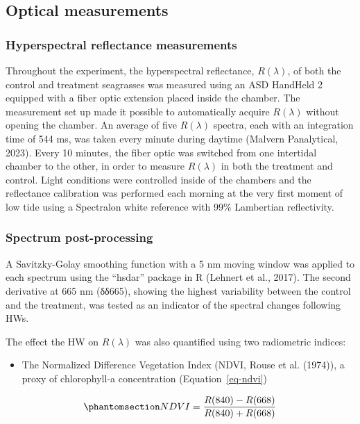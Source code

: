 \documentclass[
  letterpaper,
  DIV=11,
  numbers=noendperiod]{scrartcl}
\providecommand{\tightlist}{%
  \setlength{\itemsep}{0pt}\setlength{\parskip}{0pt}}
\begin{document}
\subsection{Optical measurements}\label{optical-measurements}

\subsubsection{Hyperspectral reflectance
measurements}\label{hyperspectral-reflectance-measurements}

Throughout the experiment, the hyperspectral reflectance,
\(R(\lambda)\), of both the control and treatment seagrasses was
measured using an ASD HandHeld 2 equipped with a fiber optic extension
placed inside the chamber. The measurement set up made it possible to
automatically acquire \(R(\lambda)\) without opening the chamber. An
average of five \(R(\lambda)\) spectra, each with an integration time of
544 ms, was taken every minute during daytime (Malvern Panalytical,
2023). Every 10 minutes, the fiber optic was switched from one
intertidal chamber to the other, in order to measure \(R(\lambda)\) in
both the treatment and control. Light conditions were controlled inside
of the chambers and the reflectance calibration was performed each
morning at the very first moment of low tide using a Spectralon white
reference with 99\% Lambertian reflectivity.

\subsubsection{Spectrum post-processing}\label{spectrum-post-processing}

A Savitzky-Golay smoothing function with a 5 nm moving window was
applied to each spectrum using the ``hsdar'' package in R (Lehnert et
al., 2017). The second derivative at 665 nm (δδ665), showing the highest
variability between the control and the treatment, was tested as an
indicator of the spectral changes following HWs.

The effect the HW on \(R(\lambda)\) was also quantified using two
radiometric indices:

\begin{itemize}
\tightlist
\item
  The Normalized Difference Vegetation Index (NDVI, Rouse et al.
  (1974)), a proxy of chlorophyll-a concentration
  (Equation~\ref{eq-ndvi})
\end{itemize}

\begin{equation}\phantomsection\label{eq-ndvi}{
NDVI = \frac{R(840)-R(668)}{R(840)+R(668)}
}\end{equation}
\end{document}
